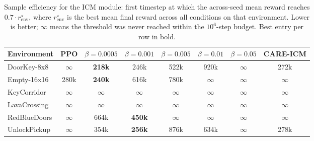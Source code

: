 \begin{table}[H]
\centering
\caption[Sample efficiency for the ICM module.]{Sample efficiency for the ICM module: first timestep at which the across-seed mean reward reaches $0.7 \cdot r^\star_\text{env}$, where $r^\star_\text{env}$ is the best mean final reward across all conditions on that environment. Lower is better; $\infty$ means the threshold was never reached within the $10^6$-step budget. Best entry per row in bold.}
\label{tab:sample_efficiency_icm}
\small
\setlength{\tabcolsep}{4pt}
\begin{tabular}{|l|c|c|c|c|c|c|c|}
\hline
\textbf{Environment} & \textbf{PPO} & \textbf{$\beta{=}0.0005$} & \textbf{$\beta{=}0.001$} & \textbf{$\beta{=}0.005$} & \textbf{$\beta{=}0.01$} & \textbf{$\beta{=}0.05$} & \textbf{CARE-ICM} \\
\hline
DoorKey-8x8 & $\infty$ & \textbf{218k} & 246k & 522k & 920k & $\infty$ & 272k \\
\hline
Empty-16x16 & 280k & \textbf{240k} & 616k & 780k & $\infty$ & $\infty$ & $\infty$ \\
\hline
KeyCorridor & $\infty$ & $\infty$ & $\infty$ & $\infty$ & $\infty$ & $\infty$ & $\infty$ \\
\hline
LavaCrossing & $\infty$ & $\infty$ & $\infty$ & $\infty$ & $\infty$ & $\infty$ & $\infty$ \\
\hline
RedBlueDoors & $\infty$ & 664k & \textbf{450k} & $\infty$ & $\infty$ & $\infty$ & $\infty$ \\
\hline
UnlockPickup & $\infty$ & 354k & \textbf{256k} & 876k & 634k & $\infty$ & 278k \\
\hline
\end{tabular}
\end{table}